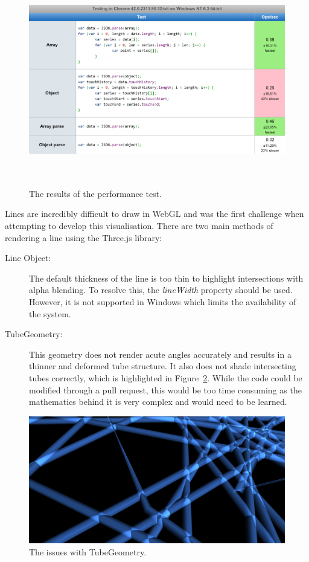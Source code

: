 \documentclass[
	fontsize=11pt
	headlines=2,
	footlines=2,
	parskip=half
]{scrartcl}
\begin{document}
\begin{appendices}
{			\begin{figure}[H]
        		\href{http://jsperf.com/object-and-array-reading}{\includegraphics[width=\textwidth,height=8.5cm]{images/performance-test}}
				\caption{The results of the performance test.}
				\label{fig:performance_test}
			\end{figure}
			
			Lines are incredibly difficult to draw in WebGL \citep{deslauriers2015lines} and was the first challenge when attempting to develop this visualisation. There are two main methods of rendering a line using the Three.js library: 
			
			\begin{description}
				\item[Line Object:] The default thickness of the line is too thin to highlight intersections with alpha blending. To resolve this, the \emph{lineWidth} property should be used. However, it is not supported in Windows which limits the availability of the system.
				\item[TubeGeometry:] This geometry does not render acute angles accurately and results in a thinner and deformed tube structure. It also does not shade intersecting tubes correctly, which is highlighted in Figure~\ref{fig:tube_geometry}. While the code could be modified through a pull request, this would be too time consuming as the mathematics behind it is very complex and would need to be learned.
			\end{description}
			
			\begin{figure}[H]
        		\includegraphics[width=\textwidth]{images/tube-geometry}
				\caption{The issues with TubeGeometry.}
				\label{fig:tube_geometry}
			\end{figure}
			
}
\end{appendices}
\end{document}
